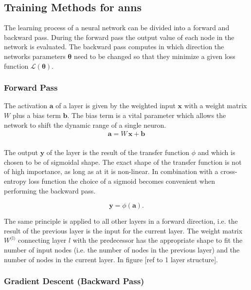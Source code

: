 \subsection{Training Methods for \glspl{ann}}
\label{trainingANN}

The learning process of a neural network can be divided into a forward and backward pass. During the forward pass the output value of each node in the network is evaluated. The backward pass computes in which direction the networks parameters $\mathbf{\theta}$ need to be changed so that they minimize a given loss function $\mathcal{L}(\mathbf{\theta})$.

\subsubsection{Forward Pass}
The activation $\mathbf{a}$ of a layer is given by the weighted input $\mathbf{x}$ with a weight matrix $W$ plus a bias term $\mathbf{b}$. The bias term is a vital parameter which allows the network to shift the dynamic range of a single neuron. 
\begin{align}
\mathbf{a} = W \, \mathbf{x} + \mathbf{b} \\
\end{align}

The output $\mathbf{y}$ of the layer is the result of the transfer function $\phi$ and which is chosen to be of sigmoidal shape. The exact shape of the transfer function is not of high importance, as long as at it is non-linear. In combination with a cross-entropy loss function the choice of a sigmoid becomes convenient when performing the backward pass.

\begin{equation}
\mathbf{y} = \phi(\mathbf{a}).
\end{equation}

The same principle is applied to all other layers in a forward direction, i.e. the result of the previous layer is the input for the current layer. The weight matrix $W^{\text{(l)}}$ connecting layer $l$ with the predecessor has the appropriate shape to fit the number of input nodes (i.e. the number of nodes in the previous layer) and the number of nodes in the current layer. In figure [ref to 1 layer structure].

\subsubsection{Gradient Descent (Backward Pass)}

